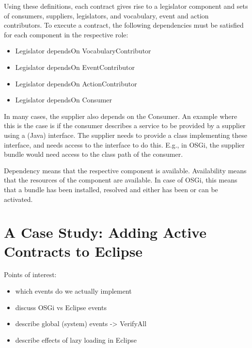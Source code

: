 \documentclass{llncs}
\begin{document}
\lstset{ language=OCL }


Using these definitions, each contract gives rise to a legislator component and sets of consumers, suppliers, legislators, and vocabulary, event and action contributors. To execute a contract, the following dependencies must be satisfied for each component in the respective role: 

\begin{itemize}
  \item Legislator dependsOn VocabularyContributor
  \item Legislator dependsOn EventContributor
  \item Legislator dependsOn ActionContributor
  \item Legislator dependsOn Consumer
\end{itemize}

In many cases, the supplier also depends on the Consumer. An example where this is the case is if the consumer describes a service to be provided by a supplier using a (Java) interface. The supplier needs to provide a class implementing these interface, and needs access to the interface to do this. E.g., in OSGi, the supplier bundle would need access to the class path of the consumer. 

Dependency means that the respective component is available. Availability means that the resources of the component are available. In case of OSGi, this means that a bundle has been installed, resolved and either has been or can be activated. 



\section{A Case Study: Adding Active Contracts to Eclipse}
\label{section:caseStudy}

Points of interest:

\begin{itemize}
	\item which events do we actually implement
  \item discuss OSGi vs Eclipse events
  \item describe global (system) events -> VerifyAll
  \item describe effects of lazy loading in Eclipse
\end{itemize}
\end{document}
